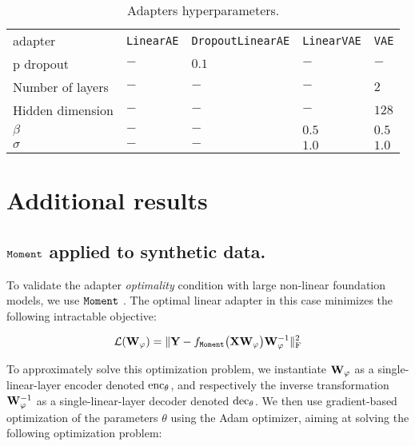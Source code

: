\begin{table}[!ht]
  \scriptsize
  \caption{Adapters hyperparameters.}
  \label{table:hypers}
  \centering
  \begin{tabular}{lllll}
    \toprule
    adapter
    & \texttt{LinearAE}
    & \texttt{DropoutLinearAE}
    & \texttt{LinearVAE}
    & \texttt{VAE}
    \\
    \cmidrule(r){1-5}
    p dropout
    & $-$   
    & $0.1$ 
    & $-$ 
    & $-$ 
    \\
    Number of layers
    & $-$   
    & $-$ 
    & $-$ 
    & $2$ 
    \\
    Hidden dimension
    & $-$   
    & $-$ 
    & $-$ 
    & $128$
    \\
    $\beta$
    & $-$   
    & $-$ 
    & $0.5$
    & $0.5$
    \\
    $\sigma$
    & $-$   
    & $-$ 
    & $1.0$
    & $1.0$
    \\
    \bottomrule
  \end{tabular}
\end{table}



\section{Additional results}
\label{appendix:results}


\subsection{$\texttt{Moment}$ applied to synthetic data.}
\label{appendix:moment_synth}

To validate the adapter \emph{optimality} condition with large non-linear foundation models, we use $\texttt{Moment}$ \citep{goswami2024moment}. The optimal linear adapter in this case minimizes the following intractable objective:

\begin{equation}
\label{eq:moment_linear}
    \mathcal{L} (\mathbf{W}_{\varphi}) = \|\mathbf{Y} - f_{\text{$\texttt{Moment}$}}\big(\mathbf{X} \mathbf{W}_{\varphi} \big) \mathbf{W}_{\varphi}^{-1}\|_{\mathrm{F}}^2
\end{equation}

To approximately solve this optimization problem, we instantiate $\mathbf{W}_{\varphi}$ as a single-linear-layer encoder denoted $\mathrm{enc}_\theta$, and respectively the inverse transformation $\mathbf{W}_{\varphi}^{-1}$ as a single-linear-layer decoder denoted $\mathrm{dec}_\theta$. We then use gradient-based optimization of the parameters $\theta$ using the Adam optimizer, aiming at solving the following optimization problem:

